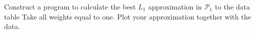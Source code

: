 \begin{problem}
Construct a program to calculate the best $L_1$ approximation in $\mathcal{P}_1$ to the data
table
Take all weights equal to one. Plot your approximation together with the data.
\end{problem}


\begin{solution}

\end{solution}

